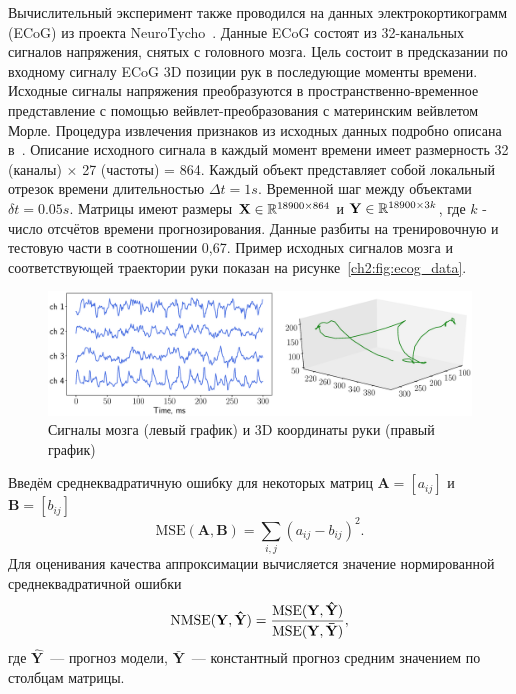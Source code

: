 Вычислительный эксперимент также проводился на данных электрокортикограмм (ECoG) из проекта NeuroTycho~\cite{shimoda2012decoding}.
Данные ECoG состоят из 32-канальных сигналов напряжения, снятых с головного мозга.
Цель состоит в предсказании по входному сигналу ECoG 3D позиции рук в последующие моменты времени.
Исходные сигналы напряжения преобразуются в пространственно-временное представление с помощью вейвлет-преобразования с материнским вейвлетом Морле.
Процедура извлечения признаков из исходных данных подробно описана в~\cite{chao2010long,eliseyev2016penalized}.
Описание исходного сигнала в каждый момент времени имеет размерность 32 (каналы) $\times $ 27 (частоты) = 864.
Каждый объект представляет собой локальный отрезок времени длительностью $\Delta t = 1s$. Временной шаг между объектами $\delta t = 0.05 s$.
Матрицы имеют размеры $\mathbf{X} \in \mathbb{R}^{18900 \times 864}$ и $\mathbf{Y} \in \mathbb{R}^{18900 \times 3k}$, где $k$ - число отсчётов времени прогнозирования.
Данные разбиты на тренировочную и тестовую части в соотношении 0,67. 
Пример исходных сигналов мозга и соответствующей траектории руки показан на рисунке~\ref{ch2:fig:ecog_data}.

\begin{figure}
	\centering
	\includegraphics[width=\linewidth]{figs/ch2/ecog_data}
	\caption{Сигналы мозга (левый график) и 3D координаты руки (правый график)}
	\label{ch1:fig:ecog_data}
\end{figure}

Введём среднеквадратичную ошибку для некоторых матриц $\mathbf{A} = [a_{ij}]$ и $\mathbf{B} = [b_{ij}]$
\[
\text{MSE} (\mathbf{A}, \mathbf{B}) = \sum_{i,j} (a_{ij} - b_{ij})^2.
\]
Для оценивания качества аппроксимации вычисляется значение нормированной среднеквадратичной ошибки
\begin{equation}
\text{NMSE}(\mathbf{Y},  \mathbf{\hat{Y}}) = \frac{\text{MSE} (\mathbf{Y}, \mathbf{\hat{Y}})}{\text{MSE} (\mathbf{Y}, \mathbf{\bar{Y}})},
\label{ch1:eq:nmse}
\end{equation}
где $\mathbf{\hat{Y}}$~--- прогноз модели, $\mathbf{\bar{Y}}$~--- константный прогноз средним значением по столбцам матрицы.

